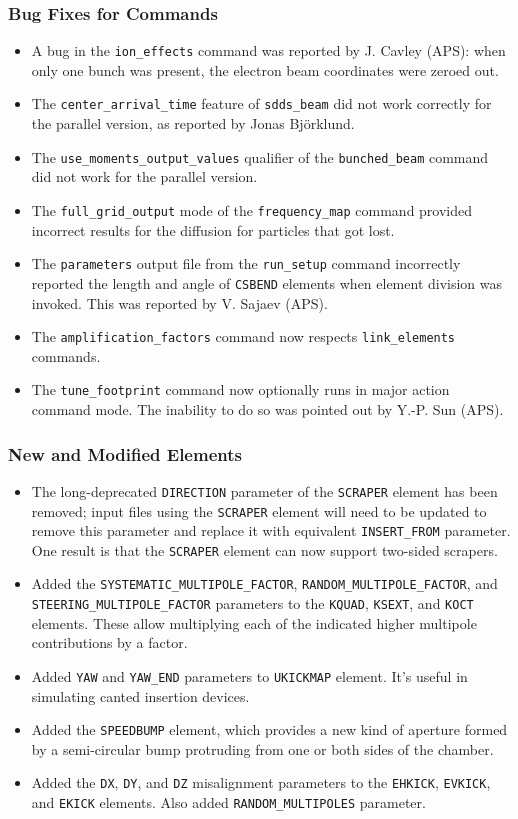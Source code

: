 \documentclass[11pt]{article}
\begin{document}
\subsubsection{Bug Fixes for Commands}
\begin{itemize}
\item A bug in the \verb|ion_effects| command was reported by J. Cavley (APS): when only one bunch was present,
  the electron beam coordinates were zeroed out. 
\item The \verb|center_arrival_time| feature of \verb|sdds_beam| did not work correctly for the parallel version, as
  reported by Jonas Bj{\"o}rklund. 
\item The \verb|use_moments_output_values| qualifier of the \verb|bunched_beam| command did not work for the parallel
  version. 
\item The \verb|full_grid_output| mode of the \verb|frequency_map| command provided incorrect results for the
  diffusion for particles that got lost.
\item The \verb|parameters| output file from the \verb|run_setup| command incorrectly reported the length and angle
  of \verb|CSBEND| elements when element division was invoked. This was reported by V. Sajaev (APS).
\item The \verb|amplification_factors| command now respects \verb|link_elements| commands.
\item The \verb|tune_footprint| command now optionally runs in major action command mode. The inability to do so
  was pointed out by Y.-P. Sun (APS).
\end{itemize}

\subsubsection{New and Modified Elements}
\begin{itemize}
\item The long-deprecated \verb|DIRECTION| parameter of the \verb|SCRAPER| element has been removed; input files using the
  \verb|SCRAPER| element will  need to be updated to remove this parameter and replace it with
  equivalent \verb|INSERT_FROM| parameter.
  One result is that the \verb|SCRAPER| element can now support two-sided scrapers.
\item Added the \verb|SYSTEMATIC_MULTIPOLE_FACTOR|, \verb|RANDOM_MULTIPOLE_FACTOR|, and \verb|STEERING_MULTIPOLE_FACTOR|
  parameters to the \verb|KQUAD|, \verb|KSEXT|, and \verb|KOCT| elements. These allow multiplying each of the indicated 
  higher multipole contributions by a factor.
\item Added \verb|YAW| and \verb|YAW_END| parameters to \verb|UKICKMAP| element. It's useful in simulating canted insertion
  devices.
\item Added the \verb|SPEEDBUMP| element, which provides a new kind of aperture formed by a semi-circular bump 
  protruding from one or both sides of the chamber.
\item Added the \verb|DX|, \verb|DY|, and \verb|DZ| misalignment parameters to the \verb|EHKICK|, \verb|EVKICK|, and \verb|EKICK|
  elements. Also added \verb|RANDOM_MULTIPOLES| parameter.
\end{itemize}
\end{document}
